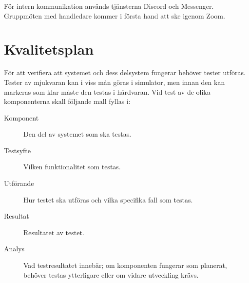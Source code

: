 \documentclass[a4paper]{article}
\begin{document}
För intern kommunikation används tjänsterna Discord och Messenger. Gruppmöten med handledare kommer i första hand att ske igenom Zoom.

\section{Kvalitetsplan}

För att verifiera att systemet och dess delsystem fungerar behöver tester utföras. Tester av mjukvaran kan i viss mån göras i simulator, men innan den kan markeras som klar måste den testas i hårdvaran. Vid test av de olika komponenterna skall följande mall fyllas i:

\begin{description}
\item[Komponent] Den del av systemet som ska testas.

\item[Testsyfte] Vilken funktionalitet som testas.

\item[Utförande] Hur testet ska utföras och vilka specifika fall som testas.

\item[Resultat] Resultatet av testet.

\item[Analys] Vad testresultatet innebär; om komponenten fungerar som planerat, behöver testas ytterligare eller om vidare utveckling krävs.
\end{description}




\end{document}
